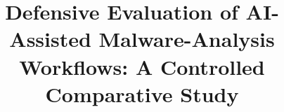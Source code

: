 \title{Defensive Evaluation of AI-Assisted Malware-Analysis Workflows: A Controlled Comparative Study}
